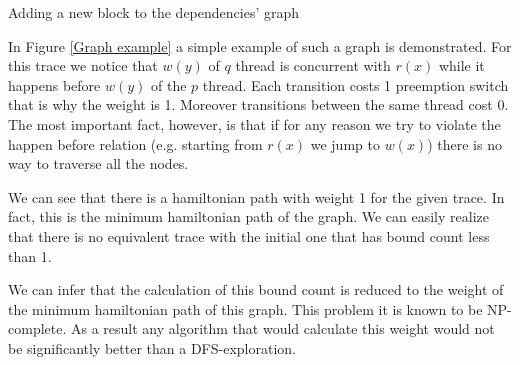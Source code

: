\begin{algorithm}[H]
    \caption{Adding a new block to the dependencies' graph}
    \label{Adding a new block to the dependencies graph}
\end{algorithm}



In Figure \ref{Graph example} a simple example of such a graph is demonstrated. For this trace we notice that $w(y)$ of $q$ thread is concurrent with $r(x)$ while 
it happens before $w(y)$ of the $p$ thread. Each transition costs 1 preemption switch that is why the weight is 1. Moreover transitions between the same thread cost 0.
The most important fact, however, is that if for any reason we try to violate the happen before relation (e.g. starting from $r(x)$ we jump to $w(x)$) there is no way to 
traverse all the nodes. 

We can see that there is a hamiltonian path with weight 1 for the given trace. In fact, this is the minimum hamiltonian path of the graph. We can easily realize that 
there is no equivalent trace with the initial one that has bound count less than 1. 

We can infer that the calculation of this bound count is reduced to the weight of the minimum hamiltonian path of this graph. This problem it is known to be NP-complete. 
As a result any algorithm that would calculate this weight would not be significantly better than a DFS-exploration. 

